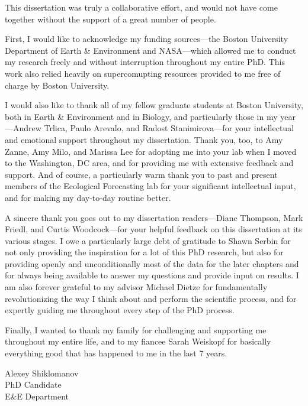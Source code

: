This dissertation was truly a collaborative effort, and would not have come together without the support of a great number of people.

First, I would like to acknowledge my funding sources---the Boston University Department of Earth \& Environment and NASA---which allowed me to conduct my research freely and without interruption throughout my entire PhD.
This work also relied heavily on supercomupting resources provided to me free of charge by Boston University.

I would also like to thank all of my fellow graduate students at Boston University, both in Earth \& Environment and in Biology,
and particularly those in my year---Andrew Trlica, Paulo Arevalo, and Radost Stanimirova---for your intellectual and emotional support throughout my dissertation.
Thank you, too, to Amy Zanne, Amy Milo, and Marissa Lee for adopting me into your lab when I moved to the Washington, DC area,
and for providing me with extensive feedback and support.
And of course, a particularly warm thank you to past and present members of the Ecological Forecasting lab for your significant intellectual input, and for making my day-to-day routine better. 

A sincere thank you goes out to my dissertation readers---Diane Thompson, Mark Friedl, and Curtis Woodcock---for your helpful feedback on this dissertation at its various stages.
I owe a particularly large debt of gratitude to Shawn Serbin for not only providing the inspiration for a lot of this PhD research, but also for providing openly and unconditionally most of the data for the later chapters and for always being available to answer my questions and provide input on results.
I am also forever grateful to my advisor Michael Dietze for fundamentally revolutionizing the way I think about and perform the scientific process, and for expertly guiding me throughout every step of the PhD process.

Finally, I wanted to thank my family for challenging and supporting me throughout my entire life, and to my fiancee Sarah Weiskopf for basically everything good that has happened to me in the last 7 years.

\vskip 1in

\noindent
Alexey Shiklomanov\\
PhD Candidate\\
E\&E Department
